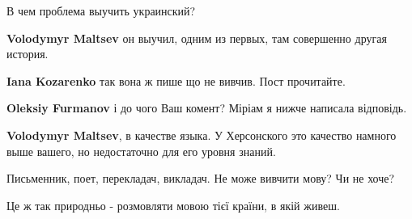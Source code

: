 \begin{itemize}
 

В чем проблема выучить украинский?

\begin{itemize}
 
\textbf{Volodymyr Maltsev} он выучил, одним из первых, там совершенно другая история.

 
\textbf{Iana Kozarenko} так вона ж пише що не вивчив. Пост прочитайте.

 
\textbf{Oleksiy Furmanov} і до чого Ваш комент? Міріам я нижче написала відповідь.

 
\textbf{Volodymyr Maltsev}, в качестве языка. У Херсонского это качество намного выше вашего, но недостаточно для его уровня знаний.
\end{itemize}

 

Письменник, поет, перекладач, викладач. Не може вивчити мову? Чи не хоче?

Це ж так природньо - розмовляти мовою тієї країни, в якій живеш.


\end{itemize}
